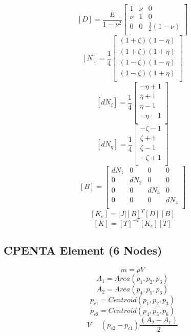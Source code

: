 \documentclass[a4paper,12pt]{article}
\begin{document}
   \[  [D] = \frac{E}{1-\nu^2} \left[ \begin{array}{ccc}
               1   & \nu & 0  \\
               \nu & 1   & 0 \\
               0   & 0   & \frac{1}{2} (1-\nu)  \\
            \end{array}\right] \]
    \[ [N] = \frac{1}{4} \left[ \begin{array}{c}
               (1+\zeta)(1-\eta) \\
               (1+\zeta)(1+\eta) \\
               (1-\zeta)(1-\eta) \\
               (1-\zeta)(1+\eta) \\
            \end{array}\right]\]
    \[ [dN_\zeta] = \frac{1}{4} \left[ \begin{array}{c}
               -\eta +1 \\
               \eta + 1 \\
               \eta-1 \\
               -\eta-1 \\
            \end{array}\right]\]
    \[ [dN_\eta] = \frac{1}{4} \left[ \begin{array}{c}
               -\zeta -1 \\
               \zeta + 1 \\
               \zeta-1 \\
               -\zeta+1 \\
            \end{array}\right]\]
    \[ [B] = \left[ \begin{array}{cccc}
               dN_1 & 0 & 0 & 0 \\
               0 & dN_2 & 0 & 0 \\
               0 & 0 & dN_3 & 0 \\
               0 & 0 & 0 & dN_4 \\
            \end{array}\right]\]
     \[  [K_e] = |J| [B]^T [D] [B] \]
      \[ [K] = [T]^{-T} [K_e] [T]  \]

   \subsection{CPENTA Element (6 Nodes)}
     \[ m = \rho V \]
     \[ A_1 = Area(p_1, p_2, p_3) \]
     \[ A_2 = Area(p_4, p_5, p_6) \]
     \[ p_{c1} = Centroid(p_1, p_2 ,p_3) \]
     \[ p_{c2} = Centroid(p_4, p_5 ,p_6) \]
     \[ V = (p_{c2}-p_{c1}) \frac{(A_2 - A_1)}{2} \]
\end{document}
